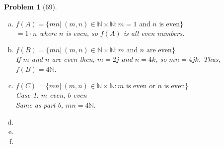\documentclass{article}
\theoremstyle{problem}
\newtheorem{prob}{Problem}
\theoremstyle{plain}
\theoremstyle{remark}
\begin{document}
\begin{prob}[69]
\begin{enumerate}[a)]\ \\[-1cm]
\item $f(A) = \{mn|\ (m,n) \in \mathbb{N} \times \mathbb{N}: m = 1 \text{ and } n \text{ is even}\}$\\
$= 1\cdot n$ where $n$ is even, so $f(A)$ is all even numbers.
\item $f(B) = \{mn|\ (m,n) \in \mathbb{N} \times \mathbb{N}: m \text{ and } n \text{ are even}\}$\\
If $m$ and $n$ are even then, $m = 2j$ and $n = 4k$, so $mn = 4jk$. Thus, $f(B) = 4\mathbb{N}$.
\item $f(C) = \{mn|\ (m,n) \in \mathbb{N} \times \mathbb{N}: m \text{ is even or } n \text{ is even}\}$\\
Case 1: $m$ even, $b$ even\\
Same as part $b$, $mn = 4\mathbb{N}$.
\item
\item 
\item 
\end{enumerate}
\end{prob}
\end{document}
